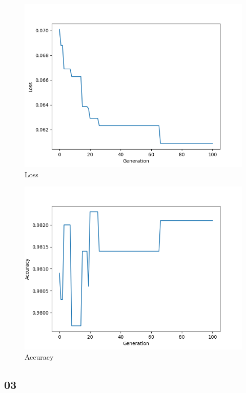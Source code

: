 \documentclass[twoside,conference,a4paper]{IEEEtran}
\begin{document}
\begin{figure}[htbp]
        \centering \includegraphics[width=1\columnwidth]{./imgs/01_mnist_auto.png}
        \caption{
                \label{fig:loss_mnist_auto_01}
                Loss
        }
\end{figure}
\begin{figure}[htbp]
        \centering \includegraphics[width=1\columnwidth]{./imgs/01_mnist_auto_acc.png}
        \caption{
                \label{fig:acc_mnist_auto_01}
                Accuracy
        }
\end{figure}

\subsection{03}
\end{document}
